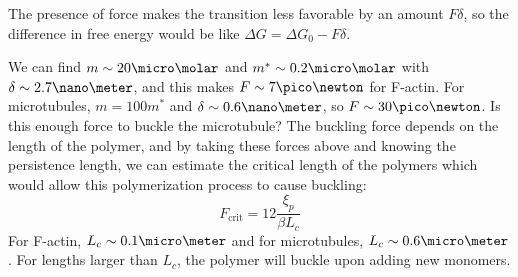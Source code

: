 \documentclass[a4paper,twoside,master.tex]{subfiles}
\begin{document}
The presence of force makes the transition less favorable by an amount $ F \delta $, so the difference in free energy would be like $ \Delta G = \Delta G_0 - F \delta $. 

We can find $ m \sim 20 \micro\molar $ and $ m^* \sim 0.2 \micro\molar $ with $ \delta \sim 2.7\nano\meter $, and this makes $ F \sim 7 \pico\newton $ for F-actin. For microtubules, $ m = 100m^* $ and $ \delta \sim 0.6\nano\meter $, so $ F \sim 30\pico\newton $. Is this enough force to buckle the microtubule? The buckling force depends on the length of the polymer, and by taking these forces above and knowing the persistence length, we can estimate the critical length of the polymers which would allow this polymerization process to cause buckling:
\begin{equation}
    F_{\text{crit}} = 12 \frac{\xi_p}{\beta L_c}
\end{equation}
For F-actin, $ L_c \sim 0.1 \micro\meter $ and for microtubules, $ L_c \sim 0.6\micro\meter $. For lengths larger than $ L_c $, the polymer will buckle upon adding new monomers.
\end{document}
